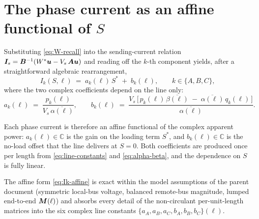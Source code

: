 
\section{\texorpdfstring{The phase current as an affine functional of $S$}{The phase current as an affine functional of S}}
\label{sec:affine}

Substituting \autoref{eq:W-recall} into the sending-current relation
$\bm{I}_{s} = \bm{B}^{-1}(W^{*}\bm{u} - V_{s}\,\bm{A}\bm{u})$ and reading off the
$k$-th component yields, after a straightforward algebraic
rearrangement,
%
\begin{equation}
\label{eq:Ik-affine}
I_{k}(S,\ell) \;=\; a_{k}(\ell)\,S^{*} \;+\; b_{k}(\ell),
\qquad k \in \{A,B,C\},
\end{equation}
%
where the two complex coefficients depend on the line only:
%
\begin{equation}
\label{eq:ak-bk}
a_{k}(\ell) \;=\;
   \frac{p_{k}(\ell)}{V_{s}\,\overline{\alpha(\ell)}},
\qquad
b_{k}(\ell) \;=\;
   \frac{V_{s}\,\bigl[\,p_{k}(\ell)\,\overline{\beta(\ell)} \;-\;
                          \overline{\alpha(\ell)}\,q_{k}(\ell)\,\bigr]}
        {\overline{\alpha(\ell)}}.
\end{equation}

\noindent Each phase current is therefore an affine functional of the
complex apparent power: $a_{k}(\ell)\in\mathbb{C}$ is the gain on the
loading term $S^{*}$, and $b_{k}(\ell)\in\mathbb{C}$ is the no-load
offset that the line delivers at $S=0$. Both coefficients are produced
once per length from \autoref{eq:line-constants} and
\autoref{eq:alpha-beta}, and the dependence on $S$ is fully linear.

The affine form \autoref{eq:Ik-affine} is exact within the model
assumptions of the parent document (symmetric local-bus voltage,
balanced remote-bus magnitude, lumped end-to-end $\bm{M}(\ell)$) and
absorbs every detail of the non-circulant per-unit-length matrices
into the six complex line constants
$\{a_{A},a_{B},a_{C},b_{A},b_{B},b_{C}\}(\ell)$.
